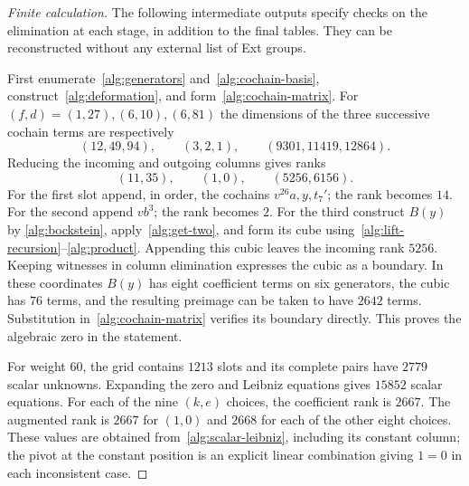 \documentclass[11pt]{article}
\theoremstyle{definition}
\theoremstyle{remark}
\numberwithin{equation}{section}
\begin{document}
\begin{proof}[Finite calculation]
The following intermediate outputs specify checks on the elimination
at each stage, in addition to the final tables.  They can be
reconstructed without any external list of Ext groups.

First enumerate~\eqref{alg:generators} and~\eqref{alg:cochain-basis},
construct~\eqref{alg:deformation}, and form~\eqref{alg:cochain-matrix}.
For $(f,d)=(1,27),(6,10),(6,81)$ the dimensions of the three
successive cochain terms are respectively
\[
 (12,49,94),\qquad(3,2,1),\qquad(9301,11419,12864).
\]
Reducing the incoming and outgoing columns gives ranks
\[
 (11,35),\qquad(1,0),\qquad(5256,6156).
\]
For the first slot append, in order, the cochains
$v^{26}a,y,t_7'$; the rank becomes $14$.  For the second append
$vb^3$; the rank becomes $2$.  For the third construct $B(y)$ by
\eqref{alg:bockstein}, apply~\eqref{alg:get-two}, and form its cube
using~\eqref{alg:lift-recursion}--\eqref{alg:product}.  Appending
this cubic leaves the incoming rank $5256$.  Keeping witnesses in
column elimination expresses the cubic as a boundary.  In these
coordinates $B(y)$ has eight coefficient terms on six generators,
the cubic has $76$ terms, and the resulting preimage can be taken to
have $2642$ terms.  Substitution in~\eqref{alg:cochain-matrix} verifies
its boundary directly.  This proves the algebraic zero in the statement.

For weight $60$, the grid contains $1213$ slots and its complete pairs
have $2779$ scalar unknowns.  Expanding the zero and Leibniz equations
gives $15852$ scalar equations.  For each of the nine $(k,e)$ choices,
the coefficient rank is $2667$.  The augmented rank is $2667$ for
$(1,0)$ and $2668$ for each of the other eight choices.  These values
are obtained from~\eqref{alg:scalar-leibniz}, including its constant
column; the pivot at the constant position is an explicit linear
combination giving $1=0$ in each inconsistent case.


\end{proof}
\end{document}
